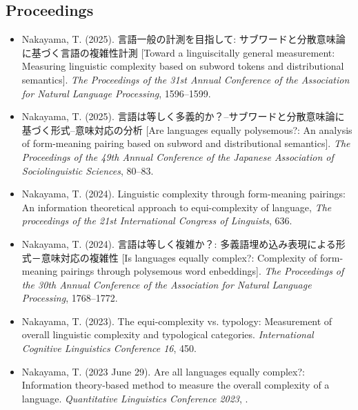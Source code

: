 \documentclass[a4paper,11pt]{article}
\begin{document}
\subsection*{Proceedings}
\begin{itemize}[leftmargin=*, itemsep=0em, topsep=0em]
  \item Nakayama, T. (2025). 言語一般の計測を目指して: サブワードと分散意味論に基づく言語の複雑性計測 [Toward a linguiscitally general measurement: Measuring linguistic complexity based on subword tokens and distributional semantics]. \textit{The Proceedings of the 31st Annual Conference of the Association for Natural Language Processing}, 1596–1599.
  \item Nakayama, T. (2025). 言語は等しく多義的か？–サブワードと分散意味論に基づく形式–意味対応の分析 [Are languages equally polysemous?: An analysis of form-meaning pairing based on subword and distributional semantics]. \textit{The Proceedings of the 49th Annual Conference of the Japanese Association of Sociolinguistic Sciences}, 80–83.
  \item Nakayama, T. (2024). Linguistic complexity through form-meaning pairings: An information theoretical approach to equi-complexity of language, \textit{The proceedings of the 21st International Congress of Linguists}, 636.
  \item Nakayama, T. (2024). 言語は等しく複雑か？: 多義語埋め込み表現による形式－意味対応の複雑性 [Is languages equally complex?: Complexity of form-meaning pairings through polysemous word enbeddings]. \textit{The Proceedings of the 30th Annual Conference of the Association for Natural Language Processing}, 1768–1772.
  \item Nakayama, T. (2023). The equi-complexity vs. typology: Measurement of overall linguistic complexity and typological categories. \textit{International Cognitive Linguistics Conference 16}, 450.
  \item Nakayama, T. (2023 June 29). Are all languages equally complex?: Information theory-based method to measure the overall complexity of a language. \textit{Quantitative Linguistics Conference 2023}, .
\end{itemize}

\vspace{1em}
\end{document}
